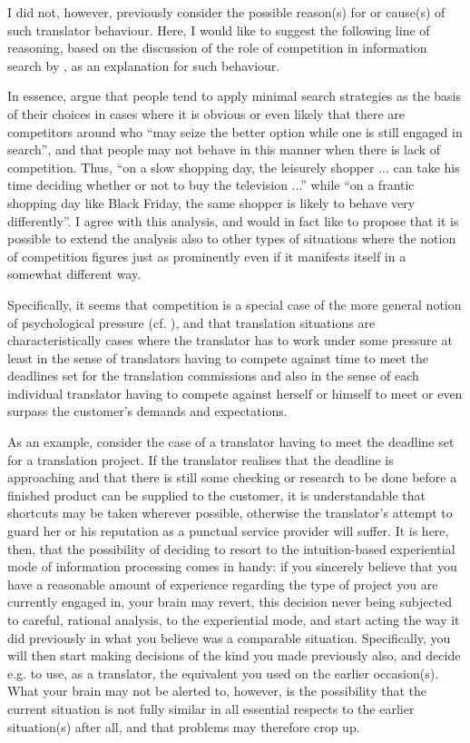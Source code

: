 \documentclass[output=paper]{LSP/langsci}
\begin{document}
  \largerpage[-1]
  I did not, however, previously consider the possible reason(s) for or cause(s) of such translator behaviour. Here, I would like to suggest the following line of reasoning, based on the discussion of the role of competition in information search by \citet{Phillips2014}, as an explanation for such behaviour.

In essence, \citet[104]{Phillips2014} argue that people tend to apply minimal search strategies as the basis of their choices in cases where it is obvious or even likely that there are competitors around who ``may seize the better option while one is still engaged in search'', and that people may not behave in this manner when there is lack of competition. Thus, ``on a slow shopping day, the leisurely shopper ...  can take his time deciding whether or not to buy the television ...''  while ``on a frantic shopping day like Black Friday, the same shopper is likely to behave very differently''. I agree with this analysis, and would in fact like to propose that it is possible to extend the analysis also to other types of situations where the notion of competition figures just as prominently even if it manifests itself in a somewhat different way.

Specifically, it seems that competition is a special case of the more general notion of psychological pressure (cf. \cite{kilduff2010}), and that translation situations are characteristically cases where the translator has to work under some pressure at least in the sense of translators having to compete against time to meet the deadlines set for the translation commissions and also in the sense of each individual translator having to compete against herself or himself to meet or even surpass the customer's demands and expectations.

As an example, consider the case of a translator having to meet the deadline set for a translation project. If the translator realises that the deadline is approaching and that there is still some checking or research to be done before a finished product can be supplied to the customer, it is understandable that shortcuts may be taken wherever possible, otherwise the translator's attempt to guard her or his reputation as a punctual service provider will suffer. It is here, then, that the possibility of deciding to resort to the intuition-based experiential mode of information processing comes in handy: if you sincerely believe that you have a reasonable amount of experience regarding the type of project you are currently engaged in, your brain may revert, this decision never being subjected to careful, rational analysis, to the experiential mode, and start acting the way it did previously in what you believe was a comparable situation. Specifically, you will then start making decisions of the kind you made previously also, and decide e.g. to use, as a translator, the equivalent you used on the earlier occasion(s). What your brain may not be alerted to, however, is the possibility that the current situation is not fully similar in all essential respects to the earlier situation(s) after all, and that problems may therefore crop up.
\end{document}
